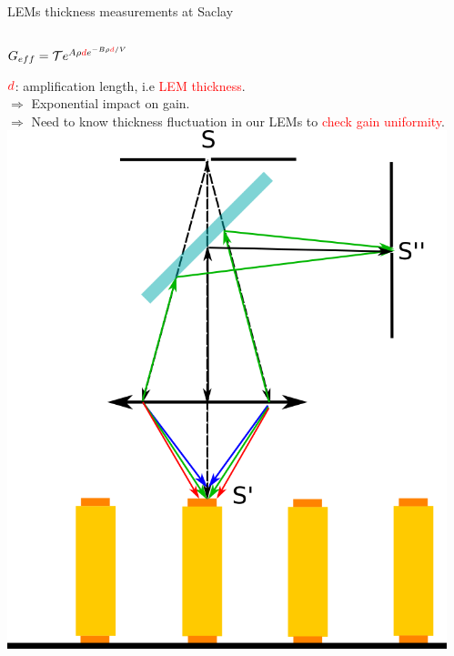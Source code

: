 \documentclass[10pt]{beamer}
\begin{document}
    \begin{frame}{LEMs thickness measurements at Saclay}
    	\begin{scriptsize}
    		\begin{columns}
    			\begin{column}{0.5\textwidth}
    				\begin{center}
    					$G _{eff}= \mathcal{T}e^{A\rho \textcolor{red}{d} e^{-B\rho \textcolor{red}{d}/V}}$\\
    				\end{center}
    				$\textcolor{red}{d}$: amplification length, i.e \textcolor{red}{LEM thickness}.\\
    				$\Rightarrow$ Exponential impact on gain.\\
    				$\Rightarrow$ Need to know thickness fluctuation in our LEMs to \textcolor{red}{check gain uniformity}.\\
    				\vfill
    				\centering \includegraphics[height=0.5\textheight]{figures/666/CCI.png}\\\vfill
    			\end{column}
    			\hfill
    			\begin{column}{0.5\textwidth}

\end{column}
\end{columns}
\end{scriptsize}
\end{frame}
\end{document}
